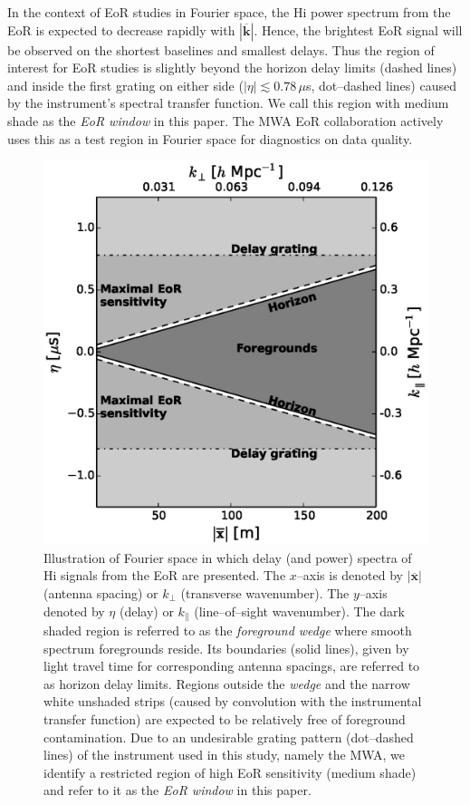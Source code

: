 \documentclass[preprint2,iop,numberedappendix]{emulateapj}
\begin{document}
In the context of EoR studies in Fourier space, the H{\sc i} power spectrum from the EoR is expected to decrease rapidly with $|\overline{\mathbf{k}}|$. Hence, the brightest EoR signal will be observed on the shortest baselines and smallest delays. Thus the region of interest for EoR studies is slightly beyond the horizon delay limits (dashed lines) and inside the first grating on either side ($|\eta| \lesssim 0.78\,\mu$s, dot--dashed lines) caused by the instrument's spectral transfer function. We call this region with medium shade as the {\it EoR window} in this paper. The MWA EoR collaboration actively uses this as a test region in Fourier space for diagnostics on data quality.

\begin{figure}[htb]
\centering
\includegraphics[width=\linewidth]{figures/v1_0/fourier_space_185.0_MHz_30.7_MHz.eps}
\caption{Illustration of Fourier space in which delay (and power) spectra of H{\sc i} signals from the EoR are presented. The $x$--axis is denoted by $|\overline{\mathbf{x}}|$ (antenna spacing) or $k_\perp$ (transverse wavenumber). The $y$--axis denoted by $\eta$ (delay) or $k_\parallel$ (line--of--sight wavenumber). The dark shaded region is referred to as the {\it foreground wedge} where smooth spectrum foregrounds reside. Its boundaries (solid lines), given by light travel time for corresponding antenna spacings, are referred to as horizon delay limits. Regions outside the {\it wedge} and the narrow white unshaded strips (caused by convolution with the instrumental transfer function) are expected to be relatively free of foreground contamination. Due to an undesirable grating pattern (dot--dashed lines) of the instrument used in this study, namely the MWA, we identify a restricted region of high EoR sensitivity (medium shade) and refer to it as the {\it EoR window} in this paper. \label{fig:fourier-space}}
\end{figure}
\end{document}
